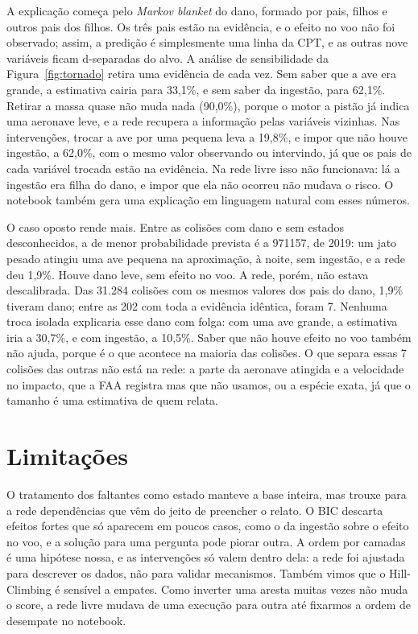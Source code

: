 \documentclass[10pt,a4paper,twocolumn]{article}
\begin{document}
A explicação começa pelo \emph{Markov blanket} do dano, formado por pais, filhos e outros pais dos filhos. Os três pais
estão na evidência, e o efeito no voo não foi observado; assim, a predição é simplesmente uma linha da CPT, e as outras
nove variáveis ficam d-separadas do alvo. A análise de sensibilidade da Figura~\ref{fig:tornado} retira uma evidência
de cada vez. Sem saber que a ave era grande, a estimativa cairia para 33,1\%, e sem saber da ingestão, para 62,1\%.
Retirar a massa quase não muda nada (90,0\%), porque o motor a pistão já indica uma aeronave leve, e a rede recupera a
informação pelas variáveis vizinhas. Nas intervenções, trocar a ave por uma pequena leva a 19,8\%, e impor que não
houve ingestão, a 62,0\%, com o mesmo valor observando ou intervindo, já que os pais de cada variável trocada estão na
evidência. Na rede livre isso não funcionava: lá a ingestão era filha do dano, e impor que ela não ocorreu não mudava
o risco. O notebook também gera uma explicação em linguagem natural com esses números.

O caso oposto rende mais. Entre as colisões com dano e sem estados desconhecidos, a de menor probabilidade prevista é
a 971157, de 2019: um jato pesado atingiu uma ave pequena na aproximação, à noite, sem ingestão, e a rede deu 1,9\%.
Houve dano leve, sem efeito no voo. A rede, porém, não estava descalibrada. Das 31.284 colisões com os mesmos valores
dos pais do dano, 1,9\% tiveram dano; entre as 202 com toda a evidência idêntica, foram 7. Nenhuma troca isolada
explicaria esse dano com folga: com uma ave grande, a estimativa iria a 30,7\%, e com ingestão, a 10,5\%. Saber que
não houve efeito no voo também não ajuda, porque é o que acontece na maioria das colisões. O que separa essas 7
colisões das outras não está na rede: a parte da aeronave atingida e a velocidade no impacto, que a FAA registra mas
que não usamos, ou a espécie exata, já que o tamanho é uma estimativa de quem relata.

\section{Limitações}

O tratamento dos faltantes como estado manteve a base inteira, mas trouxe para a rede dependências que vêm do jeito de
preencher o relato. O BIC descarta efeitos fortes que só aparecem em poucos casos, como o da ingestão sobre o efeito no
voo, e a solução para uma pergunta pode piorar outra. A ordem por camadas é uma hipótese nossa, e as intervenções só
valem dentro dela: a rede foi ajustada para descrever os dados, não para validar mecanismos. Também vimos que o
Hill-Climbing é sensível a empates. Como inverter uma aresta muitas vezes não muda o score, a rede livre mudava de uma
execução para outra até fixarmos a ordem de desempate no notebook.
\end{document}
